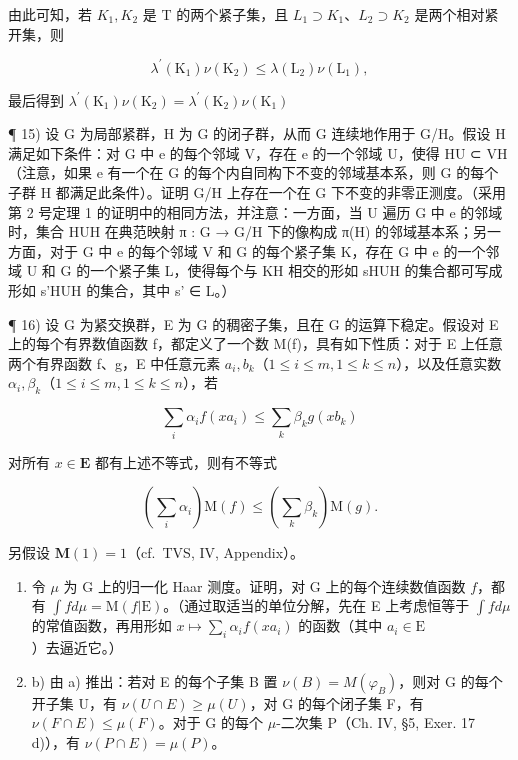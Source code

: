 由此可知，若 \(K_{1}, K_{2}\) 是 T 的两个紧子集，且 \(L_{1} \supset K_{1}\)、\(L_{2} \supset K_{2}\) 是两个相对紧开集，则

\[
\lambda^ {\prime} (\mathrm{K} _ {1}) \nu (\mathrm{K} _ {2}) \leqslant \lambda (\mathrm{L} _ {2}) \nu (\mathrm{L} _ {1}),
\]

最后得到 \(\lambda^{\prime}(\mathrm{K}_{1})\nu (\mathrm{K}_{2}) = \lambda^{\prime}(\mathrm{K}_{2})\nu (\mathrm{K}_{1})\)

¶ 15) 设 G 为局部紧群，H 为 G 的闭子群，从而 G 连续地作用于 G/H。假设 H 满足如下条件：对 G 中 e 的每个邻域 V，存在 e 的一个邻域 U，使得 HU ⊂ VH（注意，如果 e 有一个在 G 的每个内自同构下不变的邻域基本系，则 G 的每个子群 H 都满足此条件）。证明 G/H 上存在一个在 G 下不变的非零正测度。（采用第 2 号定理 1 的证明中的相同方法，并注意：一方面，当 U 遍历 G 中 e 的邻域时，集合 HUH 在典范映射 π : G → G/H 下的像构成 π(H) 的邻域基本系；另一方面，对于 G 中 e 的每个邻域 V 和 G 的每个紧子集 K，存在 G 中 e 的一个邻域 U 和 G 的一个紧子集 L，使得每个与 KH 相交的形如 sHUH 的集合都可写成形如 s'HUH 的集合，其中 s' ∈ L。）

¶ 16) 设 G 为紧交换群，E 为 G 的稠密子集，且在 G 的运算下稳定。假设对 E 上的每个有界数值函数 f，都定义了一个数 M(f)，具有如下性质：对于 E 上任意两个有界函数 f、g，E 中任意元素 \(a_{i}, b_{k}\)（\(1 \leqslant i \leqslant m, 1 \leqslant k \leqslant n\)），以及任意实数 \(\alpha_{i}, \beta_{k}\)（\(1 \leqslant i \leqslant m, 1 \leqslant k \leqslant n\)），若

\[
\sum_ {i} \alpha_ {i} f (x a _ {i}) \leqslant \sum_ {k} \beta_ {k} g (x b _ {k})
\]

对所有 \(x \in \mathbf{E}\) 都有上述不等式，则有不等式

\[
\left(\sum_ {i} \alpha_ {i}\right) \mathrm{M} (f) \leqslant \left(\sum_ {k} \beta_ {k}\right) \mathrm{M} (g).
\]

另假设 \(\mathbf{M}(1) = 1\)（cf.~TVS, IV, Appendix）。

\begin{enumerate}
\def\labelenumi{\alph{enumi})}
\item
  令 \(\mu\) 为 G 上的归一化 Haar 测度。证明，对 G 上的每个连续数值函数 \(f\)，都有 \(\int f d\mu = \mathrm{M}(f|\mathrm{E})\)。（通过取适当的单位分解，先在 E 上考虑恒等于 \(\int f d\mu\) 的常值函数，再用形如 \(x \mapsto \sum_{i} \alpha_i f(xa_i)\) 的函数（其中 \(a_i \in \mathrm{E}\)）去逼近它。）
\item
  b) 由 a) 推出：若对 E 的每个子集 B 置 \(\nu(B) = M(\varphi_B)\)，则对 G 的每个开子集 U，有 \(\nu(U \cap E) \geqslant \mu(U)\)，对 G 的每个闭子集 F，有 \(\nu(F \cap E) \leqslant \mu(F)\)。对于 G 的每个 \(\mu\)-二次集 P（Ch. IV, §5, Exer. 17 d)），有 \(\nu(P \cap E) = \mu(P)\)。
\end{enumerate}

